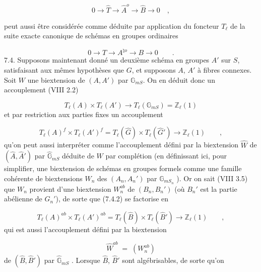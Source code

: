 \begin{equation*}
0 \longrightarrow \hat{T} \longrightarrow \hat{A}^{o} \longrightarrow \hat{B} \longrightarrow 0 \quad ,
\end{equation*}


peut aussi être considérée comme déduite par application du foncteur $T_{\ell}$ de la suite exacte canonique de schémas en groupes ordinaires

\begin{equation*}
0 \longrightarrow T \longrightarrow A^{\natural o} \longrightarrow B \longrightarrow 0 \qquad .
\end{equation*}
7.4. Supposons maintenant donné un deuxième schéma en groupes $A'$ sur $S$, satisfaisant aux mêmes hypothèses que $G$, et supposons $A$, $A'$ à fibres connexes. Soit $W$ une biextension de $(A,A')$ par $\mathbb{G}_{mS}$. On en déduit donc un accouplement (VIII 2.2)

\begin{equation}\tag{7.4.1}
T_{\ell}(A) \times T_{\ell}(A') \longrightarrow T_{\ell}(\mathbb{G}_{mS}) = \mathbb{Z}_{\ell}(1)
\end{equation}
et par restriction aux parties fixes un accouplement

\begin{equation}\tag{7.4.2}
T_{\ell}(A)^{f} \times T_{\ell}(A')^{f} = T_{\ell}(\hat{G}) \times T_{\ell}(\hat{G}') \longrightarrow \mathbb{Z}_{\ell}(1) \qquad ,
\end{equation}
qu'on peut aussi interpréter comme l'accouplement défini par la biextension $\hat{W}$ de $(\hat{A},\hat{A}')$ par $\hat{\mathbb{G}}_{mS}$ déduite de $W$ par complétion (en définissant ici, pour simplifier, une biextension de schémas en groupes formels comme une famille cohérente de biextensions $W_{n}$ des $(A_{n},A_{n}')$ par $\mathbb{G}_{mS_{n}}$ ). Or on sait (VIII 3.5) que $W_{n}$ provient d'une biextension $W_{n}^{ab}$ de $(B_{n},B_{n}')$ (où $B_{n}'$ est la partie abélienne de $G_{n}'$), de sorte que (7.4.2) se factorise en

\begin{equation}\tag{7.4.3}
T_{\ell}(A)^{ab} \times T_{\ell}(A')^{ab} = T_{\ell}(\hat{B}) \times T_{\ell}(\hat{B}') \longrightarrow \mathbb{Z}_{\ell}(1) \qquad ,
\end{equation}
qui est aussi l'accouplement défini par la biextension

\begin{equation*}
\hat{W}^{ab} \;=\; (W_{n}^{ab})
\end{equation*}
de $(\hat{B},\hat{B}')$ par $\hat{\mathbb{G}}_{mS}$ . Lorsque $\hat{B}$, $\hat{B}'$ sont algébrisables, de sorte qu'on


